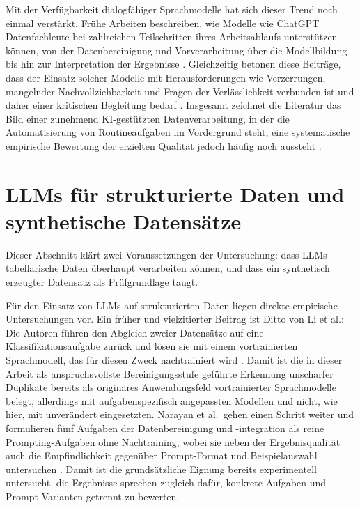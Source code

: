 Mit der Verfügbarkeit dialogfähiger Sprachmodelle hat sich dieser Trend noch einmal verstärkt. Frühe Arbeiten beschreiben, wie Modelle wie ChatGPT Datenfachleute bei zahlreichen Teilschritten ihres Arbeitsablaufs unterstützen können, von der Datenbereinigung und Vorverarbeitung über die Modellbildung bis hin zur Interpretation der Ergebnisse \autocite{hassaniRoleChatGPTData2023,bharadiyaRoleMachineLearning2023}. Gleichzeitig betonen diese Beiträge, dass der Einsatz solcher Modelle mit Herausforderungen wie Verzerrungen, mangelnder Nachvollziehbarkeit und Fragen der Verlässlichkeit verbunden ist und daher einer kritischen Begleitung bedarf \autocite{hassaniRoleChatGPTData2023,safitraAdvancementsArtificialIntelligence2024}. Insgesamt zeichnet die Literatur das Bild einer zunehmend \ac{KI}-gestützten Datenverarbeitung, in der die Automatisierung von Routineaufgaben im Vordergrund steht, eine systematische empirische Bewertung der erzielten Qualität jedoch häufig noch aussteht \autocite{mumuniAutomatedDataProcessing2025,coteDataCleaningMachine2024}.

\section{LLMs für strukturierte Daten und synthetische Datensätze}
\label{sec:llm-tabellen}

Dieser Abschnitt klärt zwei Voraussetzungen der Untersuchung: dass \acp{LLM} tabellarische Daten überhaupt verarbeiten können, und dass ein synthetisch erzeugter Datensatz als Prüfgrundlage taugt.

Für den Einsatz von \acp{LLM} auf strukturierten Daten liegen direkte empirische Untersuchungen vor. Ein früher und vielzitierter Beitrag ist Ditto von Li et al.: Die Autoren führen den Abgleich zweier Datensätze auf eine Klassifikationsaufgabe zurück und lösen sie mit einem vortrainierten Sprachmodell, das für diesen Zweck nachtrainiert wird \autocite{liDeepEntityMatching2020}. Damit ist die in dieser Arbeit als anspruchsvollste Bereinigungsstufe geführte Erkennung unscharfer Duplikate bereits als originäres Anwendungsfeld vortrainierter Sprachmodelle belegt, allerdings mit aufgabenspezifisch angepassten Modellen und nicht, wie hier, mit unverändert eingesetzten. Narayan et al.\ gehen einen Schritt weiter und formulieren fünf Aufgaben der Datenbereinigung und -integration als reine Prompting-Aufgaben ohne Nachtraining, wobei sie neben der Ergebnisqualität auch die Empfindlichkeit gegenüber Prompt-Format und Beispielauswahl untersuchen \autocite{narayanFoundationModelsWrangle2022}. Damit ist die grundsätzliche Eignung bereits experimentell untersucht, die Ergebnisse sprechen zugleich dafür, konkrete Aufgaben und Prompt-Varianten getrennt zu bewerten.

